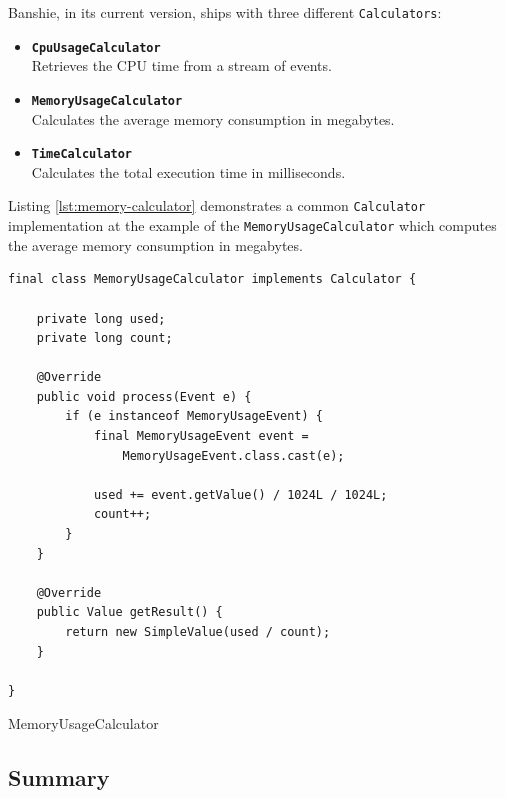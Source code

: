 Banshie, in its current version, ships with three different \texttt{Calculators}:

\begin{itemize}
	\item \textbf{\texttt{CpuUsageCalculator}} \\
		Retrieves the CPU time from a stream of events.
	\item \textbf{\texttt{MemoryUsageCalculator}} \\
		Calculates the average memory consumption in megabytes.
	\item \textbf{\texttt{TimeCalculator}} \\
		Calculates the total execution time in milliseconds.
\end{itemize}

\newpage
Listing \ref{lst:memory-calculator} demonstrates a common \texttt{Calculator} implementation at the example of the \texttt{MemoryUsageCalculator} which computes the average memory consumption in megabytes.

\begin{listing}[H]
\begin{verbatim}
final class MemoryUsageCalculator implements Calculator {

    private long used;
    private long count;

    @Override
    public void process(Event e) {
        if (e instanceof MemoryUsageEvent) {
            final MemoryUsageEvent event = 
                MemoryUsageEvent.class.cast(e);

            used += event.getValue() / 1024L / 1024L;
            count++;
        }
    }

    @Override
    public Value getResult() {
        return new SimpleValue(used / count);
    }

}
\end{verbatim}
\caption{MemoryUsageCalculator}
\label{lst:memory-calculator}
\end{listing}

\subsection{Summary}
